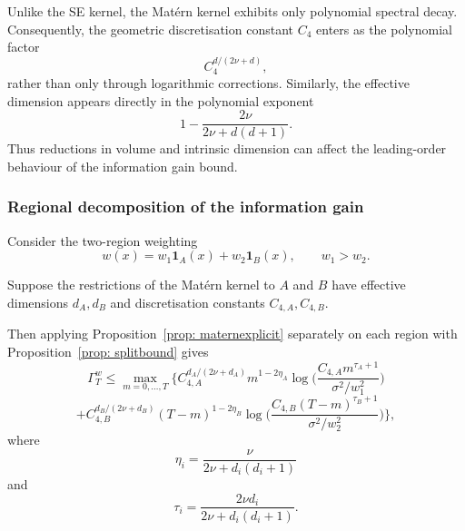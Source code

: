 \begin{remark}
Unlike the SE kernel, the Mat\'ern kernel exhibits only polynomial spectral decay. Consequently, the geometric discretisation constant $C_4$ enters as the polynomial factor
\begin{equation*}
C_4^{d/(2\nu+d)},
\end{equation*}
rather than only through logarithmic corrections. Similarly, the effective dimension appears directly in the polynomial exponent
\begin{equation*}
1-\frac{2\nu}{2\nu+d(d+1)}.
\end{equation*}
Thus reductions in volume and intrinsic dimension can affect the leading-order behaviour of the information gain bound.
\end{remark}

\subsubsection{Regional decomposition of the information gain}

\begin{corollary}
Consider the two-region weighting
\begin{equation*}
w(x)
=
w_1\mathbf 1_A(x)
+
w_2\mathbf 1_B(x),
\qquad
w_1>w_2.
\end{equation*}

Suppose the restrictions of the Mat\'ern kernel to $A$ and $B$
have effective dimensions $d_A,d_B$ and discretisation constants
$C_{4,A},C_{4,B}$.

Then applying Proposition~\ref{prop: maternexplicit} separately on each region with Proposition~\ref{prop: splitbound}
gives
\begin{equation*}
\Gamma_T^w
\le
\max_{m=0,\ldots,T}
\Big\{
C_{4,A}^{d_A/(2\nu+d_A)}
m^{1-2\eta_A}
\log\!\Big(
\frac{C_{4,A}m^{\tau_A+1}}{\sigma^2/w_1^2}
\Big)
\end{equation*}
\begin{equation*}
+
C_{4,B}^{d_B/(2\nu+d_B)}
(T-m)^{1-2\eta_B}
\log\!\Big(
\frac{C_{4,B}(T-m)^{\tau_B+1}}
{\sigma^2/w_2^2}
\Big)
\Big\},
\end{equation*}
where
\begin{equation*}
\eta_i
=
\frac{\nu}
{2\nu+d_i(d_i+1)}
\end{equation*}
and 
$$\tau_i=\frac{2 \nu d_i}{2 \nu+d_i\left(d_i+1\right)}.$$
\end{corollary}


